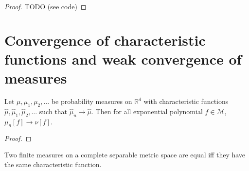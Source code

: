 \begin{proof}
\leanok
TODO (see code)
\end{proof}




\section{Convergence of characteristic functions and weak convergence of measures}


\begin{lemma}\label{lem:tendsto_M_of_tendsto_charFun}
\leanok
{}
Let $\mu, \mu_1, \mu_2, \ldots$ be probability measures on $\mathbb{R}^d$ with characteristic functions $\hat{\mu}, \hat{\mu}_1, \hat{\mu}_2, \ldots$ such that $\hat{\mu}_n \to \hat{\mu}$.
Then for all exponential polynomial $f \in \mathcal M$, $\mu_n[f] \to \nu[f]$.
\end{lemma}

\begin{proof}\leanok
\end{proof}


\begin{lemma}\label{lem:ext_charFun}
\mathlibok
{}
Two finite measures on a complete separable metric space are equal iff they have the same characteristic function.
\end{lemma}

